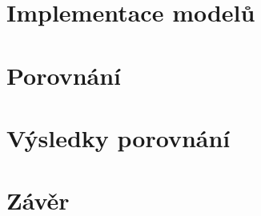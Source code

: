 \chapter{Implementace modelů}
\label{kapitola4}

\chapter{Porovnání}
\label{kapitola5}

\chapter{Výsledky porovnání}
\label{kapitola6}

\chapter{Závěr}
\label{kapitola7}


